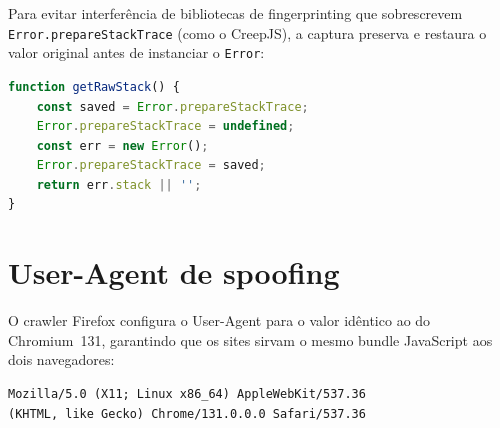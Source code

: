 Para evitar interferência de bibliotecas de fingerprinting que sobrescrevem
\texttt{Error.prepareStackTrace} (como o CreepJS), a captura preserva e restaura
o valor original antes de instanciar o \texttt{Error}:

\begin{lstlisting}[language=JavaScript]
function getRawStack() {
    const saved = Error.prepareStackTrace;
    Error.prepareStackTrace = undefined;
    const err = new Error();
    Error.prepareStackTrace = saved;
    return err.stack || '';
}
\end{lstlisting}

\section{User-Agent de spoofing}
\label{ap:ua}

O crawler Firefox configura o User-Agent para o valor idêntico ao do
Chromium~131, garantindo que os sites sirvam o mesmo bundle JavaScript aos
dois navegadores:

\begin{lstlisting}[language={}]
Mozilla/5.0 (X11; Linux x86_64) AppleWebKit/537.36
(KHTML, like Gecko) Chrome/131.0.0.0 Safari/537.36
\end{lstlisting}
